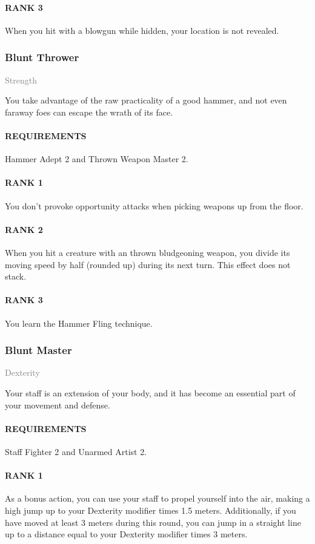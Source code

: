 \paragraph{RANK 3} When you hit with a blowgun while hidden, your location is not revealed.

\subsubsection{Blunt Thrower} \label{feat::bluntthrower}
\small{\textcolor{gray}{Strength}}

\normalsize
You take advantage of the raw practicality of a good hammer, and not even faraway foes can escape the wrath of its face.
\paragraph{REQUIREMENTS} Hammer Adept 2 and Thrown Weapon Master 2.
\paragraph{RANK 1} You don't provoke opportunity attacks when picking weapons up from the floor.
\paragraph{RANK 2} When you hit a creature with an thrown bludgeoning weapon, you divide its moving speed by half (rounded up) during its next turn.
This effect does not stack.
\paragraph{RANK 3} You learn the Hammer Fling technique.

\subsubsection{Blunt Master} \label{feat::bluntmaster}
\small{\textcolor{gray}{Dexterity}}

\normalsize
Your staff is an extension of your body, and it has become an essential part of your movement and defense.
\paragraph{REQUIREMENTS} Staff Fighter 2 and Unarmed Artist 2.
\paragraph{RANK 1} As a bonus action, you can use your staff to propel yourself into the air, making a high jump up to your Dexterity modifier times 1.5 meters.
Additionally, if you have moved at least 3 meters during this round, you can jump in a straight line up to a distance equal to your Dexterity modifier times 3 meters.
